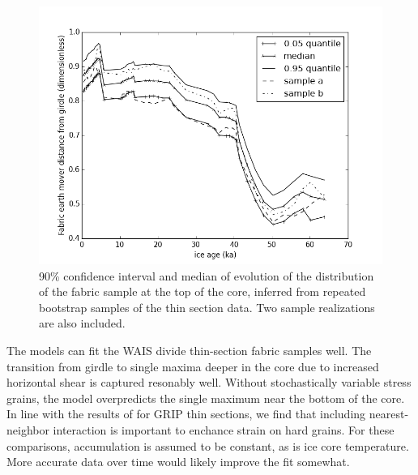 \documentclass{igs}
\begin{document}
\begin{figure}
\caption{90\% confidence interval and median of evolution of the distribution of the fabric sample at the top of the core, inferred from repeated bootstrap samples of the thin section data. Two sample realizations are also included.}
\includegraphics[width=12cm]{ci}
\end{figure}
The models can fit the WAIS divide thin-section fabric samples well. The transition from girdle to single maxima deeper in the core due to increased horizontal shear is captured resonably well. Without stochastically variable stress grains, the model overpredicts the single maximum near the bottom of the core. In line with the results of \citet{thorsteinsson2002nni} for GRIP thin sections, we find that including nearest-neighbor interaction is important to enchance strain on hard grains. For these comparisons, accumulation is assumed to be constant, as is ice core temperature. More accurate data over time would likely improve the fit somewhat. 
\end{document}
